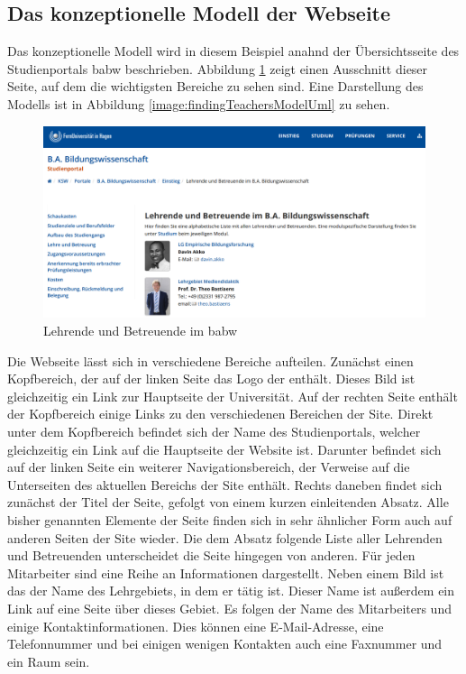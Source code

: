 \subsection{Das konzeptionelle Modell der Webseite}
    Das konzeptionelle Modell wird in diesem Beispiel anahnd
    der Übersichtsseite des Studienportals \gls{babw} beschrieben.
    Abbildung \ref{image:findingTeachersModelOverview} zeigt einen
    Ausschnitt dieser Seite, auf dem die wichtigsten Bereiche zu sehen sind.
    Eine Darstellung des Modells ist in Abbildung
    \ref{image:findingTeachersModelUml} zu sehen.

    \begin{figure}[htb]
        \centering
        \includegraphics[width=\textwidth]{../resources/findings/case-study-1/model/overview.png}
        \caption{Lehrende und Betreuende im \gls{babw}}
        \label{image:findingTeachersModelOverview}
    \end{figure}

    Die Webseite lässt sich in verschiedene Bereiche aufteilen.
    Zunächst einen Kopfbereich, der auf der linken Seite das Logo
    der {\fernUni} enthält.
    Dieses Bild ist gleichzeitig ein Link zur Hauptseite der Universität. 
    Auf der rechten Seite enthält der Kopfbereich einige Links zu den verschiedenen
    Bereichen der Site.
    Direkt unter dem Kopfbereich befindet sich der Name des Studienportals,
    welcher gleichzeitig ein Link auf die Hauptseite der Website ist.
    Darunter befindet sich auf der linken Seite ein weiterer Navigationsbereich,
    der Verweise auf die Unterseiten des aktuellen Bereichs der Site enthält.
    Rechts daneben findet sich zunächst der Titel der Seite,
    gefolgt von einem kurzen einleitenden Absatz.
    Alle bisher genannten Elemente der Seite finden sich in sehr ähnlicher Form
    auch auf anderen Seiten der Site wieder.
    Die dem Absatz folgende Liste aller Lehrenden und Betreuenden unterscheidet die Seite hingegen von anderen.
    Für jeden Mitarbeiter sind eine Reihe an Informationen dargestellt.
    Neben einem Bild ist das der Name des Lehrgebiets, in dem er tätig ist.
    Dieser Name ist außerdem ein Link auf eine Seite über dieses Gebiet.
    Es folgen der Name des Mitarbeiters
    und einige Kontaktinformationen.
    Dies können eine E-Mail-Adresse, eine Telefonnummer
    und bei einigen wenigen Kontakten auch eine Faxnummer und ein Raum sein.

